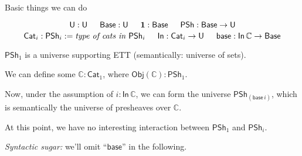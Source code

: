 \documentclass[dvipsnames,aspectratio=169]{beamer}
\newcommand{\ms}[1]{\mathsf{#1}}
\newcommand{\mbb}[1]{\mathbb{#1}}
\newcommand{\mbf}[1]{\mathbf{#1}}
\newcommand{\U}{\mathsf{U}}
\newcommand{\Base}{\mathsf{Base}}
\newcommand{\In}{\mathsf{In}}
\newcommand{\PSh}{\mathsf{PSh}}
\newcommand{\Cat}{\mathsf{Cat}}
\newcommand{\base}{\mathsf{base}}
\newcommand{\mbbC}{\mbb{C}}
\begin{document}
\begin{frame}{Basic things we can do}
\begin{block}{}
\vspace{-0.6em}
{\footnotesize
  \[ \U : \U \hspace{1.5em} \Base : \U \hspace{1.5em} \mbf{1} : \Base \hspace{1.5em} \PSh : \Base \to \U \]
  \[ \Cat_i : \PSh_i := \text{\emph{type of cats in $\PSh_i$}} \hspace{1.5em} \In : \Cat_i \to \U \hspace{1.5em} \base : \In\,\mbbC \to \Base \]
}
\end{block}
\vspace{1em}

$\PSh_1$ is a universe supporting ETT (semantically: universe of sets).
\vspace{1em}
\pause

We can define some $\mbbC : \Cat_1$, where $\ms{Obj}(\mbbC) : \PSh_1$.
\vspace{1em}
\pause

Now, \alert{under the assumption} of $i : \In\,\mbbC$, we can form the universe $\PSh_{(\base\,i)}$, which is semantically the universe of
presheaves over $\mbbC$.
\vspace{1em}
\pause

At this point, we have no interesting interaction between $\PSh_1$ and $\PSh_i$.
\vspace{1em}

{\small
\emph{Syntactic sugar:} we'll omit ``$\base$'' in the following.
\vspace{3em}
}

\end{frame}
\end{document}

